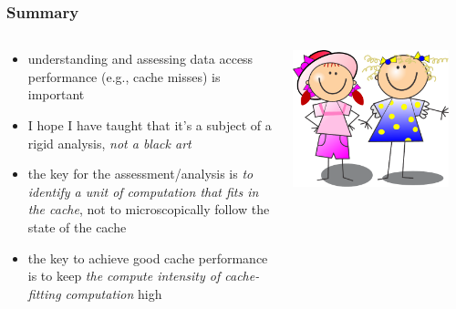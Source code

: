 \documentclass[12pt,dvipdfmx]{beamer}
\newcommand{\aka}[1]{{\color{red}#1}}
\begin{document}
\begin{frame}
\frametitle{Summary}
\begin{columns}
\begin{column}{0.7\textwidth}
\begin{itemize}
\item<1-> understanding and assessing data access
  performance (e.g., cache misses) is important

\item<2-> I hope I have taught that it's a subject
  of a rigid analysis, \aka{\em not a black art}

\item<3-> the key for the assessment/analysis is
  \aka{\em to identify a unit of computation that
    fits in the cache}, not to microscopically
  follow the state of the cache

\item<4-> the key to achieve good cache
  performance is to keep \aka{\em the compute
    intensity of cache-fitting computation} high
\end{itemize}
\end{column}

\begin{column}{0.3\textwidth}
\begin{center}
\includegraphics[width=0.9\textwidth]{out/pdf/svg/wakatta.pdf}    
\end{center}
\end{column}
\end{columns}
\end{frame}
\end{document}
